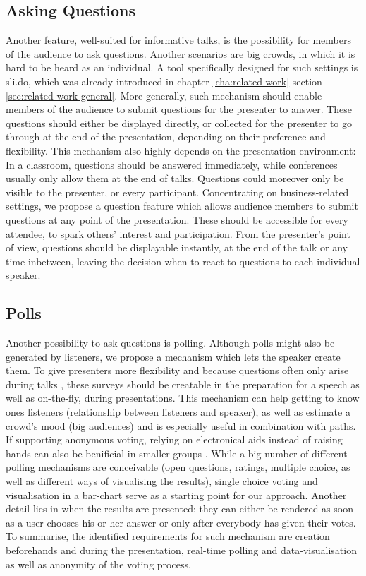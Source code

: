 \subsection{Asking Questions}
Another feature, well-suited for informative talks, is the possibility for members of the audience to ask questions. Another scenarios are big crowds, in which it is hard to be heard as an individual. A tool specifically designed for such settings is sli.do, which was already introduced in chapter \ref{cha:related-work} section \ref{sec:related-work-general}.
More generally, such mechanism should enable members of the audience to submit questions for the presenter to answer. These questions should either be displayed directly, or collected for the presenter to go through at the end of the presentation, depending on their preference and flexibility. This mechanism also highly depends on the presentation environment: In a classroom, questions should be answered immediately, while conferences usually only allow them at the end of talks. Questions could moreover only be visible to the presenter, or every participant. Concentrating on business-related settings, we propose a question feature which allows audience members to submit questions at any point of the presentation. These should be accessible for every attendee, to spark others' interest and participation. From the presenter's point of view, questions should be displayable instantly, at the end of the talk or any time inbetween, leaving the decision when to react to questions to each individual speaker.


\subsection{Polls}
Another possibility to ask questions is polling. Although polls might also be generated by listeners, we propose a mechanism which lets the speaker create them. To give presenters more flexibility and because questions often only arise during talks \cite{Esponda:ElectronicVotingOnTheFly}, these surveys should be creatable in the preparation for a speech as well as on-the-fly, during presentations. This mechanism can help getting to know ones listeners (relationship between listeners and speaker), as well as estimate a crowd's mood (big audiences) and is especially useful in combination with paths. If supporting anonymous voting, relying on electronical aids instead of raising hands can also be benificial in smaller groups \cite{Esponda:ElectronicVotingOnTheFly}.
While a big number of different polling mechanisms are conceivable (open questions, ratings, multiple choice, as well as different ways of visualising the results), single choice voting and visualisation in a bar-chart serve as a starting point for our approach. Another detail lies in when the results are presented: they can either be rendered as soon as a user chooses his or her answer or only after everybody has given their votes.
To summarise, the identified requirements for such mechanism are creation beforehands and during the presentation, real-time polling and data-visualisation as well as anonymity of the voting process.


